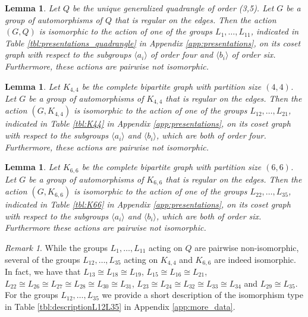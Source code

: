 \documentclass[dvipsnames]{article}
\newtheorem{lemma}[theorem]{Lemma}
\theoremstyle{definition}
\theoremstyle{remark}
\newtheorem{remark}[theorem]{Remark}
\begin{document}
    \begin{lemma}\label{lem:reg_actions_on_Q}
        Let $Q$ be the unique generalized quadrangle of order (3,5). Let $G$ be a group of automorphisms of $Q$ that is regular on the edges. Then the action $(G, Q)$ is isomorphic to the action of one of the groups $L_1,\dots, L_{11}$, indicated in Table \ref{tbl:presentations_quadrangle} in Appendix \ref{app:presentations}, on its coset graph with respect to the subgroups $\langle a_i \rangle$ of order four and $\langle b_i \rangle$ of order six. Furthermore, these actions are pairwise not isomorphic.
    \end{lemma}

    \begin{lemma}\label{lem:reg_actions_on_K44}
        Let $K_{4,4}$ be the complete bipartite graph with partition size $(4,4)$. Let $G$ be a group of automorphisms of $K_{4,4}$ that is regular on the edges. Then the action $(G, K_{4,4})$ is isomorphic to the action of one of the groups $L_{12},\dots, L_{21}$, indicated in Table \ref{tbl:K44} in Appendix \ref{app:presentations}, on its coset graph with respect to the subgroups $\langle a_i \rangle$ and $\langle b_i \rangle$, which are both of order four. Furthermore, these actions are pairwise not isomorphic.
    \end{lemma}

    \begin{lemma}\label{lem:reg_actions_on_K66}
        Let $K_{6,6}$ be the complete bipartite graph with partition size $(6,6)$. Let $G$ be a group of automorphisms of $K_{6,6}$ that is regular on the edges. Then the action $(G, K_{6,6})$ is isomorphic to the action of one of the groups $L_{22},\dots, L_{35}$, indicated in Table \ref{tbl:K66} in Appendix \ref{app:presentations}, on its coset graph with respect to the subgroups $\langle a_i \rangle$ and $\langle b_i \rangle$, which are both of order six. Furthermore these actions are pairwise not isomorphic.
    \end{lemma}
    
    \begin{remark}
        While the groups $L_1, \dots, L_{11}$ acting on $Q$ are pairwise non-isomorphic, several of the groups $L_{12}, \dots, L_{35}$ acting on $K_{4,4}$ and $K_{6,6}$ are indeed isomorphic. In fact, we have that $L_{13} \cong L_{18} \cong L_{19}$, $L_{15} \cong L_{16} \cong L_{21}$, $L_{22} \cong L_{26} \cong L_{27} \cong L_{28} \cong L_{30} \cong L_{31}$, $L_{23} \cong L_{24} \cong L_{32} \cong L_{33} \cong L_{34}$ and $L_{29} \cong L_{35}$. For the groups $L_{12}, \dots, L_{35}$ we provide a short description of the isomorphism type in Table \ref{tbl:descriptionL12L35} in Appendix \ref{app:more_data}.
    \end{remark}
\end{document}
